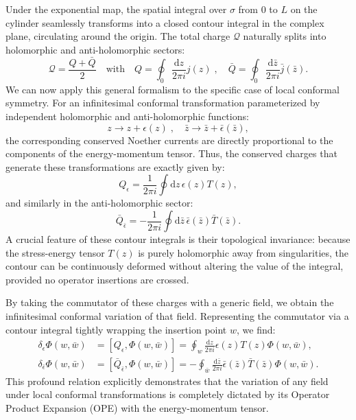 Under the exponential map, the spatial integral over \(\sigma\) from \(0\) to \(L\) on the cylinder seamlessly transforms into a closed contour integral in the complex plane, circulating around the origin. The total charge \(\mathcal{Q}\) naturally splits into holomorphic and anti-holomorphic sectors:
\[
    \mathcal{Q} = \frac{Q + \bar{Q}}{2} \quad \text{with} \quad Q = \oint_0 \frac{\mathrm{d} z}{2\pi i} j(z) \;, \quad \bar{Q} = \oint_0 \frac{\mathrm{d}\bar{z}}{2\pi i} \bar{j}(\bar{z}).
\]
We can now apply this general formalism to the specific case of local conformal symmetry. For an infinitesimal conformal transformation parameterized by independent holomorphic and anti-holomorphic functions:
\[
    z \to z + \epsilon(z) \;, \quad \bar{z} \to \bar{z} + \bar{\epsilon}(\bar{z}),
\]
the corresponding conserved Noether currents are directly proportional to the components of the energy-momentum tensor. Thus, the conserved charges that generate these transformations are exactly given by:
\[
    Q_\epsilon = \frac{1}{2\pi i} \oint \mathrm{d} z \, \epsilon(z) T(z),
\]
and similarly in the anti-holomorphic sector:
\[
    \bar{Q}_{\bar{\epsilon}} = -\frac{1}{2\pi i} \oint \mathrm{d} \bar{z} \, \bar{\epsilon}(\bar{z}) \bar{T}(\bar{z}).
\]
A crucial feature of these contour integrals is their topological invariance: because the stress-energy tensor \(T(z)\) is purely holomorphic away from singularities, the contour can be continuously deformed without altering the value of the integral, provided no operator insertions are crossed.

By taking the commutator of these charges with a generic field, we obtain the infinitesimal conformal variation of that field. Representing the commutator via a contour integral tightly wrapping the insertion point \(w\), we find:
\[
    \begin{aligned}
        \delta_\epsilon \Phi(w, \bar{w})         & = [Q_\epsilon, \Phi(w, \bar{w})] = \oint_w \frac{\mathrm{d} z}{2\pi i} \epsilon(z) T(z) \Phi(w, \bar{w}),                                                     \\
        \delta_{\bar{\epsilon}} \Phi(w, \bar{w}) & = [\bar{Q}_{\bar{\epsilon}}, \Phi(w, \bar{w})] = -\oint_{\bar{w}} \frac{\mathrm{d}\bar{z}}{2\pi i} \bar{\epsilon}(\bar{z}) \bar{T}(\bar{z}) \Phi(w, \bar{w}).
    \end{aligned}
\]
This profound relation explicitly demonstrates that the variation of any field under local conformal transformations is completely dictated by its Operator Product Expansion (OPE) with the energy-momentum tensor.

